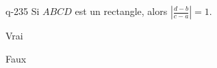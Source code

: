 \begin{truefalse}{q-235}
Si $ABCD$ est un rectangle, alors $\left|\frac{d-b}{c-a}\right|=1$.
\item* Vrai
\item Faux
\end{truefalse}


